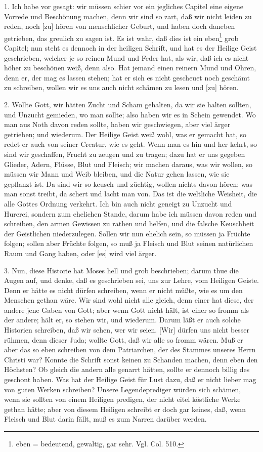1. Ich habe vor gesagt: wir müssen schier vor ein jegliches Capitel eine eigene Vorrede und Beschönung machen, denn wir sind so zart, daß wir nicht leiden zu reden, noch [zu] hören von menschlicher Geburt, und haben doch daneben getrieben, das greulich zu sagen ist. Es ist wahr, daß dies ist ein eben\footnote{eben = bedeutend, gewaltig, gar sehr. Vgl. Col. 510.} grob Capitel; nun steht es dennoch in der heiligen Schrift, und hat es der Heilige Geist geschrieben, welcher je so reinen Mund und Feder hat, als wir, daß ich es nicht höher zu beschönen weiß, denn also. Hat jemand einen reinern Mund und Ohren, denn er, der mag es lassen stehen; hat er sich es nicht gescheuet noch geschämt zu schreiben, wollen wir es uns auch nicht schämen zu lesen und [zu] hören.

2. Wollte Gott, wir hätten Zucht und Scham gehalten, da wir sie halten sollten, und Unzucht gemieden, wo man sollte; also haben wir es in Schein gewendet. Wo man aus Noth davon reden sollte, haben wir geschwiegen, aber viel ärger getrieben; und wiederum. Der Heilige Geist weiß wohl, was er gemacht hat, so redet er auch von seiner Creatur, wie es geht. Wenn man es hin und her kehrt, so sind wir geschaffen, Frucht zu zeugen und zu tragen; dazu hat er uns gegeben Glieder, Adern, Flüsse, Blut und
Fleisch; wir machen daraus, was wir wollen, so müssen wir Mann und Weib bleiben, und die Natur gehen lassen, wie sie gepflanzt ist. Da sind wir so keusch und züchtig, wollen nichts davon hören; was man sonst treibt, da schert und lacht man von. Das ist die weltliche Weisheit, die alle Gottes Ordnung verkehrt. Ich bin auch nicht geneigt zu Unzucht und Hurerei, sondern zum ehelichen Stande, darum habe ich müssen davon reden und schreiben, den armen Gewissen zu rathen und helfen, und die falsche Keuschheit der Geistlichen niederzulegen. Sollen wir nun ehelich sein, so müssen ja Früchte folgen; sollen aber Früchte folgen, so muß ja Fleisch und Blut seinen natürlichen Raum und Gang haben, oder [es] wird viel ärger.

3. Nun, diese Historie hat Moses hell und grob beschrieben; darum thue die Augen auf, und denke, daß es geschrieben sei, uns zur Lehre, vom Heiligen Geiste. Denn er hätte es nicht dürfen schreiben, wenn er nicht müßte, wie es um den Menschen gethan wäre. Wir sind wohl nicht alle gleich, denn einer hat diese, der andere jene Gaben von Gott; aber wenn Gott nicht hält, ist einer so fromm als der andere; hält er, so stehen wir, und wiederum. Darum läßt er auch solche Historien schreiben, daß wir sehen, wer wir seien. [Wir] dürfen uns nicht besser rühmen, denn dieser Juda; wollte Gott, daß wir alle so fromm wären. Muß er aber das so eben schreiben von dem Patriarchen, der des Stammes unseres Herrn Christi war? Konnte die Schrift sonst keinen zu Schanden machen, denn eben den Höchsten? Ob gleich die andern alle genarrt hätten, sollte er dennoch billig des geschont haben. Was hat der Heilige Geist für Lust dazu, daß er nicht lieber mag von guten Werken schreiben? Unsere Legendeprediger würden sich schämen, wenn sie sollten von einem Heiligen predigen, der nicht eitel köstliche Werke gethan hätte; aber von diesem Heiligen schreibt er doch gar keines, daß, wenn Fleisch und Blut darin fällt, muß es zum Narren darüber werden.

